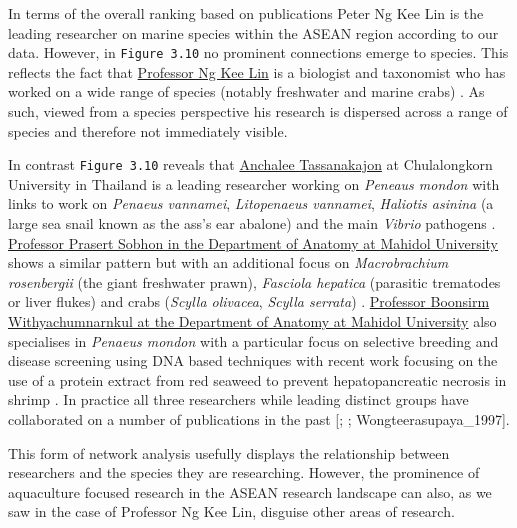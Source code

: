 \documentclass[]{book}
\theoremstyle{definition}
\theoremstyle{definition}
\theoremstyle{definition}
\theoremstyle{remark}
\begin{document}
In terms of the overall ranking based on publications Peter Ng Kee Lin
is the leading researcher on marine species within the ASEAN region
according to our data. However, in \texttt{Figure\ 3.10} no prominent
connections emerge to species. This reflects the fact that
\href{https://lkcnhm.nus.edu.sg/dna/people/details/17}{Professor Ng Kee
Lin} is a biologist and taxonomist who has worked on a wide range of
species (notably freshwater and marine crabs)
\citep{Cai_2002, Shih_2007}. As such, viewed from a species perspective
his research is dispersed across a range of species and therefore not
immediately visible.

In contrast \texttt{Figure\ 3.10} reveals that
\href{http://www.bc.sc.chula.ac.th/11Anchalee.html}{Anchalee
Tassanakajon} at Chulalongkorn University in Thailand is a leading
researcher working on \emph{Peneaus mondon} with links to work on
\emph{Penaeus vannamei}, \emph{Litopenaeus vannamei}, \emph{Haliotis
asinina} (a large sea snail known as the ass's ear abalone) and the main
\emph{Vibrio} pathogens
\citep{Wongteerasupaya_1995, Supungul_2004, Kaewkascholkul_2016}.
\href{http://www.sc.mahidol.ac.th/scan/old/Prasert.htm}{Professor
Prasert Sobhon in the Department of Anatomy at Mahidol University} shows
a similar pattern but with an additional focus on \emph{Macrobrachium
rosenbergii} (the giant freshwater prawn), \emph{Fasciola hepatica}
(parasitic trematodes or liver flukes) and crabs (\emph{Scylla
olivacea}, \emph{Scylla serrata})
\citep{Meeratana_2006, Duangprom_2017, Preyavichyapugdee_2008}.
\href{http://www.sc.mahidol.ac.th/scan/old/Boonsirm.htm}{Professor
Boonsirm Withyachumnarnkul at the Department of Anatomy at Mahidol
University} also specialises in \emph{Penaeus mondon} with a particular
focus on selective breeding and disease screening using DNA based
techniques \citep{Wongteerasupaya_1995} with recent work focusing on the
use of a protein extract from red seaweed to prevent hepatopancreatic
necrosis in shrimp \citep{Boonsri_2016}. In practice all three
researchers while leading distinct groups have collaborated on a number
of publications in the past {[}\citet{Wongteerasupaya_1995};
\citet{Pongtippatee_2007}; Wongteerasupaya\_1997{]}.

This form of network analysis usefully displays the relationship between
researchers and the species they are researching. However, the
prominence of aquaculture focused research in the ASEAN research
landscape can also, as we saw in the case of Professor Ng Kee Lin,
disguise other areas of research.
\end{document}
